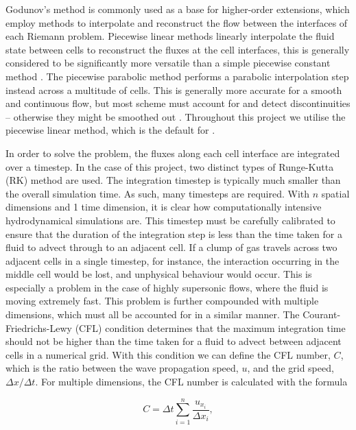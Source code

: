 Godunov's method is commonly used as a base for higher-order extensions, which employ methods to interpolate and reconstruct the flow between the interfaces of each Riemann problem.
Piecewise linear methods linearly interpolate the fluid state between cells to reconstruct the fluxes at the cell interfaces, this is generally considered to be significantly more versatile than a simple piecewise constant method \parencite{vanleerUltimateConservativeDifference1979}.
The piecewise parabolic method performs a parabolic interpolation step instead across a multitude of cells.
This is generally more accurate for a smooth and continuous flow, but most scheme must account for and detect discontinuities -- otherwise they might be smoothed out
\parencite{colella_piecewise_1984}.
Throughout this project we utilise the piecewise linear method, which is the default for \athena{}.

In order to solve the problem, the fluxes along each cell interface are integrated over a timestep.
In the case of this project, two distinct types of Runge-Kutta (RK) method are used.
The integration timestep is typically much smaller than the overall simulation time.
As such, many timesteps are required.
With $n$ spatial dimensions and 1 time dimension, it is clear how computationally intensive hydrodynamical simulations are.
This timestep must be carefully calibrated to ensure that the duration of the integration step is less than the time taken for a fluid to advect through to an adjacent cell.
If a clump of gas travels across two adjacent cells in a single timestep, for instance, the interaction occurring in the middle cell would be lost, and unphysical behaviour would occur.
This is especially a problem in the case of highly supersonic flows, where the fluid is moving extremely fast.
This problem is further compounded with multiple dimensions, which must all be accounted for in a similar manner.
The Courant-Friedrichs-Lewy (CFL) condition determines that the maximum integration time should not be higher than the time taken for a fluid to advect between adjacent cells in a numerical grid.
With this condition we can define the CFL number, $C$, which is the ratio between the wave propagation speed, $u$, and the grid speed, $\Delta x / \Delta t$.
For multiple dimensions, the CFL number is calculated with the formula

\begin{equation}
  \label{eq:cfl}
  C = \Delta t \sum^n_{i=1} \frac{u_{x_i}}{\Delta x_i} ,
\end{equation}

